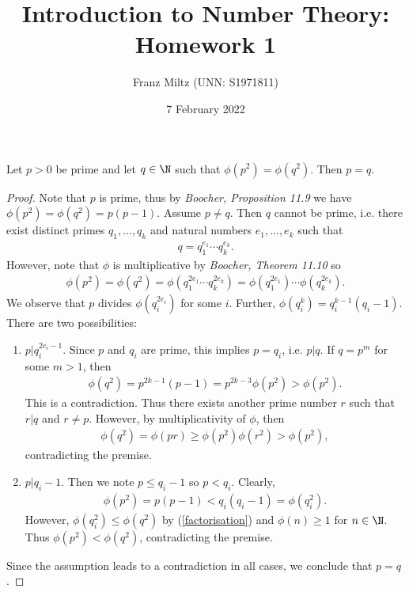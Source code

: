 \documentclass{article}
\begin{document}
\title{Introduction to Number Theory: Homework 1}
\author{Franz Miltz (UNN: S1971811)}
\date{7 February 2022}
\maketitle

\begin{claim*}[1]
   Let $p>0$ be prime and let $q\in\N$ such that $\phi\left(p^2\right) = \phi\left(q^2\right)$.
   Then $p=q$.
   \begin{proof}
      Note that $p$ is prime, thus by \emph{Boocher, Proposition 11.9} we
      have $\phi\left(p^2\right)=\phi\left(q^2\right)=p(p-1)$. Assume $p\not= q$. 
      Then $q$ cannot be prime, i.e. there exist distinct primes $q_1,...,q_k$ and natural
      numbers $e_1,...,e_k$ such that
      \begin{align*}
         q = q_1^{e_1}\cdots q_k^{e_k}.
      \end{align*}
      However, note that $\phi$ is multiplicative by \emph{Boocher, Theorem 11.10}
      so 
      \begin{align}
         \label{factorisation}
         \phi(p^2)=\phi(q^2)=\phi\left(q_1^{2e_1}\cdots q_k^{2e_k}\right)
         =\phi\left(q_1^{2e_1}\right)\cdots\phi\left(q_k^{2e_k}\right).
      \end{align}
      We observe that $p$ divides $\phi\left(q_i^{2e_i}\right)$ for some $i$.
      Further, $\phi\left(q_i^k\right)=q_i^{k-1}(q_i-1)$. There are two possibilities:
      \begin{enumerate}
         \item $p|q_i^{2e_i-1}$. Since $p$ and $q_i$ are prime, this implies 
            $p=q_i$, i.e. $p|q$. If $q=p^m$ for some $m>1$, then \begin{align*}
               \phi\left(q^2\right)=p^{2k-1}(p-1)=p^{2k-3}\phi\left(p^2\right)
               >\phi\left(p^2\right).
            \end{align*}
            This is a contradiction. Thus there exists another prime number $r$
            such that $r|q$ and $r\not=p$. However, by multiplicativity of $\phi$,
            then 
            \begin{align*}
              \phi\left(q^2\right) 
              =    \phi\left(pr\right)
              \geq \phi\left(p^2\right)\phi\left(r^2\right)
              >    \phi\left(p^2\right) ,
            \end{align*}
            contradicting the premise.
         \item $p|q_i-1$. Then we note $p\leq q_i-1$ so $p<q_i$.  Clearly, 
            \begin{align*}
               \phi\left(p^2\right)=p(p-1)<q_i(q_i-1)=\phi\left(q_i^2\right).
            \end{align*}
            However, $\phi\left(q_i^2\right)\leq \phi\left(q^2\right)$ by 
            (\ref{factorisation}) and $\phi(n)\geq 1$ for $n\in\N$. Thus 
            $\phi\left(p^2\right)<\phi\left(q^2\right)$, contradicting the premise.
      \end{enumerate}
      Since the assumption leads to a contradiction in all cases, we conclude 
      that $p=q$.
   \end{proof}
\end{claim*}
\end{document}

